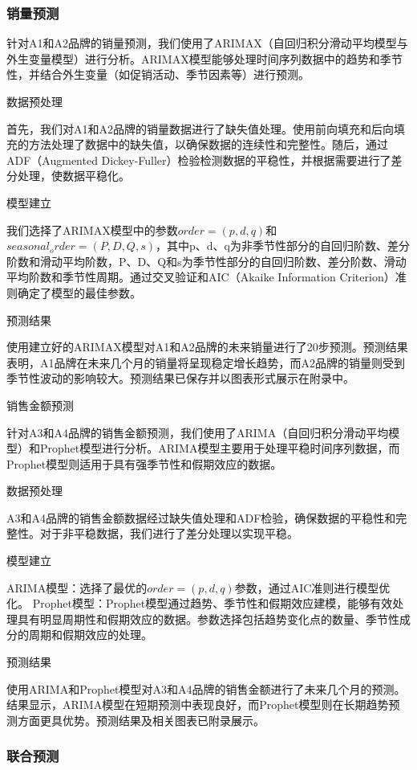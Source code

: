 \documentclass[a4paper]{article}
\begin{document}
	\subsubsection{销量预测}
	
	针对A1和A2品牌的销量预测，我们使用了ARIMAX（自回归积分滑动平均模型与外生变量模型）进行分析。ARIMAX模型能够处理时间序列数据中的趋势和季节性，并结合外生变量（如促销活动、季节因素等）进行预测。
	
	数据预处理
	
	首先，我们对A1和A2品牌的销量数据进行了缺失值处理。使用前向填充和后向填充的方法处理了数据中的缺失值，以确保数据的连续性和完整性。随后，通过ADF（Augmented Dickey-Fuller）检验检测数据的平稳性，并根据需要进行了差分处理，使数据平稳化。
	
	模型建立
	
	我们选择了ARIMAX模型中的参数$order=(p,d,q)$和$seasonal_order=(P,D,Q,s)$，其中p、d、q为非季节性部分的自回归阶数、差分阶数和滑动平均阶数，P、D、Q和s为季节性部分的自回归阶数、差分阶数、滑动平均阶数和季节性周期。通过交叉验证和AIC（Akaike Information Criterion）准则确定了模型的最佳参数。

	预测结果
	
	使用建立好的ARIMAX模型对A1和A2品牌的未来销量进行了20步预测。预测结果表明，A1品牌在未来几个月的销量将呈现稳定增长趋势，而A2品牌的销量则受到季节性波动的影响较大。预测结果已保存并以图表形式展示在附录中。

	销售金额预测

	针对A3和A4品牌的销售金额预测，我们使用了ARIMA（自回归积分滑动平均模型）和Prophet模型进行分析。ARIMA模型主要用于处理平稳时间序列数据，而Prophet模型则适用于具有强季节性和假期效应的数据。

	数据预处理

	A3和A4品牌的销售金额数据经过缺失值处理和ADF检验，确保数据的平稳性和完整性。对于非平稳数据，我们进行了差分处理以实现平稳。
	
	模型建立
	
	ARIMA模型：选择了最优的$order=(p,d,q)$参数，通过AIC准则进行模型优化。
	Prophet模型：Prophet模型通过趋势、季节性和假期效应建模，能够有效处理具有明显周期性和假期效应的数据。参数选择包括趋势变化点的数量、季节性成分的周期和假期效应的处理。
	
	预测结果
	
	使用ARIMA和Prophet模型对A3和A4品牌的销售金额进行了未来几个月的预测。结果显示，ARIMA模型在短期预测中表现良好，而Prophet模型则在长期趋势预测方面更具优势。预测结果及相关图表已附录展示。
	
	\subsubsection{联合预测}
	
\end{document}

